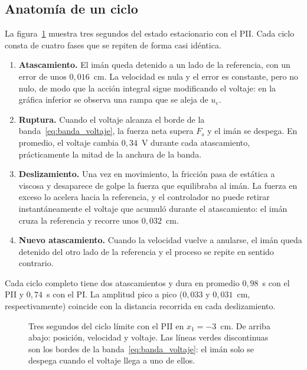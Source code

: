 \subsection{Anatomía de un ciclo}

La figura~\ref{fig:anatomia} muestra tres segundos del estado estacionario con el PII. Cada ciclo consta de cuatro fases que se repiten de forma casi idéntica.

\begin{enumerate}
  \item \textbf{Atascamiento.} El imán queda detenido a un lado de la referencia, con un error de unos $0{,}016$~cm. La velocidad es nula y el error es constante, pero no nulo, de modo que la acción integral sigue modificando el voltaje: en la gráfica inferior se observa una rampa que se aleja de $u_e$.
  \item \textbf{Ruptura.} Cuando el voltaje alcanza el borde de la banda~\eqref{eq:banda_voltaje}, la fuerza neta supera $F_s$ y el imán se despega. En promedio, el voltaje cambia $0{,}34$~V durante cada atascamiento, prácticamente la mitad de la anchura de la banda.
  \item \textbf{Deslizamiento.} Una vez en movimiento, la fricción pasa de estática a viscosa y desaparece de golpe la fuerza que equilibraba al imán. La fuerza en exceso lo acelera hacia la referencia, y el controlador no puede retirar instantáneamente el voltaje que acumuló durante el atascamiento: el imán cruza la referencia y recorre unos $0{,}032$~cm.
  \item \textbf{Nuevo atascamiento.} Cuando la velocidad vuelve a anularse, el imán queda detenido del otro lado de la referencia y el proceso se repite en sentido contrario.
\end{enumerate}

Cada ciclo completo tiene dos atascamientos y dura en promedio $0{,}98$~s con el PII y $0{,}74$~s con el PI. La amplitud pico a pico ($0{,}033$ y $0{,}031$~cm, respectivamente) coincide con la distancia recorrida en cada deslizamiento.

\begin{figure}[ht]
    \centering
    
    \caption[Anatomía del ciclo límite]{Tres segundos del ciclo límite con el PII en $x_1=-3$~cm. De arriba abajo: posición, velocidad y voltaje. Las líneas verdes discontinuas son los bordes de la banda~\eqref{eq:banda_voltaje}: el imán solo se despega cuando el voltaje llega a uno de ellos.}
    \label{fig:anatomia}
\end{figure}

